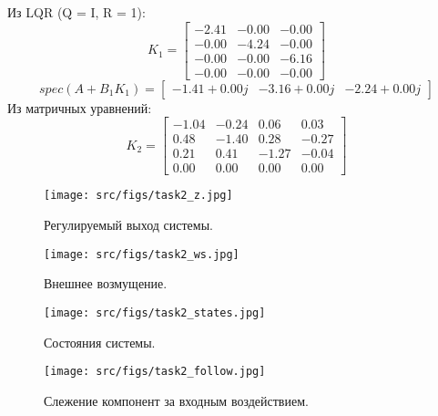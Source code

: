 Из LQR  (Q = I, R = 1):
\[K_1 = \begin{bmatrix}
  -2.41 &  -0.00 &  -0.00\\
   -0.00 & -4.24 &  -0.00\\
   -0.00 &  -0.00 & -6.16\\
   -0.00 &  -0.00 &  -0.00
 \end{bmatrix}\]
 \[spec(A + B_1 K_1) = \begin{bmatrix}
  -1.41 + 0.00j & -3.16 + 0.00j & -2.24 + 0.00j
 \end{bmatrix}\]
Из матричных уравнений:
 \[K_2 = \begin{bmatrix}
  -1.04 & -0.24 &  0.06 &  0.03\\
   0.48 & -1.40 &  0.28 & -0.27\\
   0.21 &  0.41 & -1.27 & -0.04\\
   0.00 &  0.00 &  0.00 &  0.00
 \end{bmatrix}\]


\begin{figure}[ht!]
  \centering
  \texttt{[image: src/figs/task2\_z.jpg]}
  \caption{Регулируемый выход системы.}
  \label{fig:task2_z}
\end{figure}

\begin{figure}[ht!]
  \centering
  \texttt{[image: src/figs/task2\_ws.jpg]}
  \caption{Внешнее возмущение.}
  \label{fig:task2_ws}
\end{figure}

\begin{figure}[ht!]
  \centering
  \texttt{[image: src/figs/task2\_states.jpg]}
  \caption{Состояния системы.}
  \label{fig:task2_states}
\end{figure}

\begin{figure}[ht!]
  \centering
  \texttt{[image: src/figs/task2\_follow.jpg]}
  \caption{Слежение компонент за входным воздействием.}
  \label{fig:task2_follow}
\end{figure}

\FloatBarrier